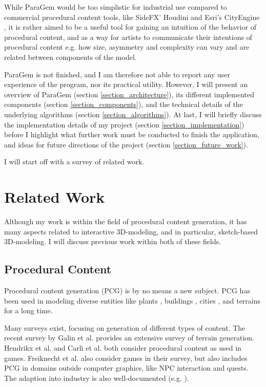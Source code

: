 \documentclass[english]{article}
\begin{document}
While ParaGem would be too simplistic for industrial use compared to commercial procedural content tools, like SideFX' Houdini \cite{houdini} and Esri's CityEngine \cite{cityengine}, it is rather aimed to be a useful tool for gaining an intuition of the behavior of procedural content, and as a way for artists to communicate their intentions of procedural content e.g. how size, asymmetry and complexity can vary and are related between components of the model.

ParaGem is not finished, and I am therefore not able to report any user experience of the program, nor its practical utility. However, I will present an overview of ParaGem (section \ref{section_architecture}), its different implemented components (section \ref{section_components}), and the technical details of the underlying algorithms (section \ref{section_algorithms}). At last, I will briefly discuss the implementation details of my project (section \ref{section_implementation}) before I highlight what further work must be conducted to finish the application, and ideas for future directions of the project (section \ref{section_future_work}).

I will start off with a survey of related work.

\pagebreak

\section{Related Work}

Although my work is within the field of procedural content generation, it has many aspects related to interactive 3D-modeling, and in particular, sketch-based 3D-modeling. I will discuss previous work within both of these fields.

\subsection{Procedural Content}

Procedural content generation (PCG) is by no means a new subject. PCG has been used in modeling diverse entities like plants \cite{plant_l_system}, buildings \cite{building_shape_grammar}, cities \cite{procedural_city_modeling}, and terrains \cite{early_terrain_generation} for a long time. 

Many surveys exist, focusing on generation of different types of content. The recent survey by Galin et al. \cite{terrain_survey_2019} provides an extensive survey of terrain generation. Hendrikx et al. \cite{pcg_survey_2013} and Carli et al. \cite{brazilian_pcg_survey} both consider procedural content as used in games. Freiknecht et al. \cite{pcg_survey_2017} also consider games in their survey, but also includes PCG in domains outside computer graphics, like NPC interaction and quests. The adaption into industry is also well-documented (e.g. \cite{amato2017}).
\end{document}
